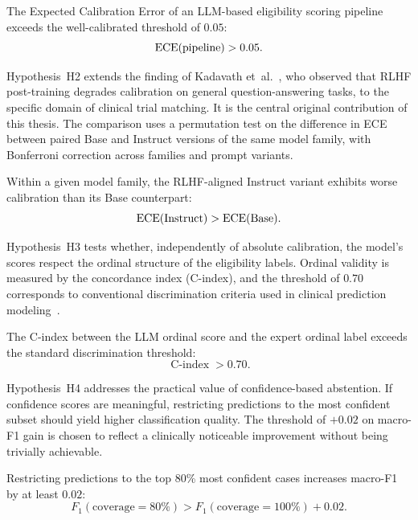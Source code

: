 \begin{hypothesis}
    The Expected Calibration Error of an LLM-based eligibility scoring 
    pipeline exceeds the well-calibrated threshold of $0.05$:
    \[
        \textrm{ECE}(\text{pipeline}) > 0.05.
    \]
\end{hypothesis}

Hypothesis~H2 extends the finding of Kadavath et~al.~\cite{kadavath2022know}, 
who observed that RLHF post-training degrades calibration on general 
question-answering tasks, to the specific domain of clinical trial matching. 
It is the central original contribution of this thesis. The comparison uses 
a permutation test on the difference in ECE between paired Base and Instruct 
versions of the same model family, with Bonferroni correction across families 
and prompt variants.

\begin{hypothesis}
    Within a given model family, the RLHF-aligned Instruct variant exhibits 
    worse calibration than its Base counterpart:
    \[
        \textrm{ECE}(\text{Instruct}) > \textrm{ECE}(\text{Base}).
    \]
\end{hypothesis}

Hypothesis~H3 tests whether, independently of absolute calibration, the 
model's scores respect the ordinal structure of the eligibility labels. 
Ordinal validity is measured by the concordance index (C-index), and the 
threshold of $0.70$ corresponds to conventional discrimination criteria used 
in clinical prediction modeling~\cite{vancalster2019calibration}.

\begin{hypothesis}
    The C-index between the LLM ordinal score and the expert ordinal label 
    exceeds the standard discrimination threshold:
    \[
        \operatorname{C-index} > 0.70.
    \]
\end{hypothesis}

Hypothesis~H4 addresses the practical value of confidence-based abstention. 
If confidence scores are meaningful, restricting predictions to the most 
confident subset should yield higher classification quality. The threshold 
of $+0.02$ on macro-F1 gain is chosen to reflect a clinically noticeable 
improvement without being trivially achievable.

\begin{hypothesis}
    Restricting predictions to the top 80\% most confident cases increases 
    macro-F1 by at least $0.02$:
    \[
        F_1(\text{coverage}=80\%) > F_1(\text{coverage}=100\%) + 0.02.
    \]
\end{hypothesis}

